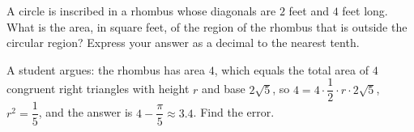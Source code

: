A circle is inscribed in a rhombus whose diagonals are $2$ feet and $4$ feet long. What is the area, in square feet, of the region of the rhombus that is outside the circular region? Express your answer as a decimal to the nearest tenth.

A student argues: the rhombus has area $4$, which equals the total area of $4$ congruent right triangles with height $r$ and base $2\sqrt5$, so $4=4\cdot\dfrac{1}{2}\cdot r\cdot2\sqrt5$, $r^2=\dfrac{1}{5}$, and the answer is $4-\dfrac{\pi}{5}\approx3.4$. Find the error.
